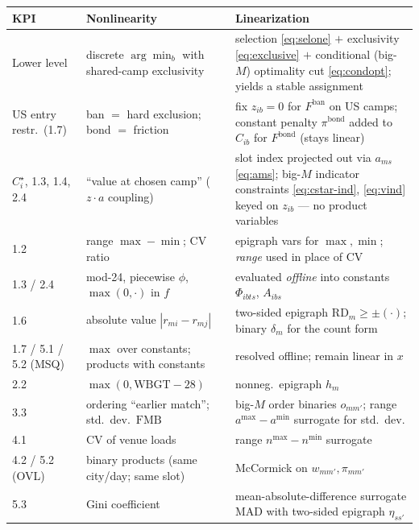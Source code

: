 \documentclass[12pt, letterpaper]{article}
\begin{document}
\begin{center}
\renewcommand{\arraystretch}{1.25}
\begin{tabular}{@{}p{2.0cm} p{4.6cm} p{6.4cm}@{}}
\toprule
\textbf{KPI} & \textbf{Nonlinearity} & \textbf{Linearization} \\
\midrule
Lower level & discrete $\arg\min_b$ with shared-camp exclusivity &
  selection \eqref{eq:selone} $+$ exclusivity \eqref{eq:exclusive} $+$
  conditional (big-$M$) optimality cut \eqref{eq:condopt}; yields a
  stable assignment \\
US entry restr.\ (1.7) & ban $=$ hard exclusion; bond $=$ friction &
  fix $z_{ib}=0$ for $F^{\mathrm{ban}}$ on US camps; constant penalty
  $\pi^{\mathrm{bond}}$ added to $C_{ib}$ for $F^{\mathrm{bond}}$ (stays
  linear) \\
$C_i^\star$, 1.3, 1.4, 2.4 & ``value at chosen camp'' ($z\!\cdot\!a$
  coupling) &
  slot index projected out via $a_{ms}$ \eqref{eq:ams}; big-$M$ indicator
  constraints \eqref{eq:cstar-ind}, \eqref{eq:vind} keyed on $z_{ib}$ ---
  no product variables \\
1.2 & range $\max-\min$; CV ratio &
  epigraph vars for $\max,\min$; \emph{range} used in place of CV \\
1.3 / 2.4 & mod-24, piecewise $\phi$, $\max(0,\cdot)$ in $f$ &
  evaluated \emph{offline} into constants $\Phi_{ibts}$, $A_{ibs}$ \\
1.6 & absolute value $|r_{mi}-r_{mj}|$ &
  two-sided epigraph $\mathrm{RD}_m\ge\pm(\cdot)$; binary $\delta_m$ for
  the count form \\
1.7 / 5.1 / 5.2 (MSQ) & $\max$ over constants; products with constants &
  resolved offline; remain linear in $x$ \\
2.2 & $\max(0,\mathrm{WBGT}-28)$ & nonneg.\ epigraph $h_m$ \\
3.3 & ordering ``earlier match''; std.\ dev.\ $\mathrm{FMB}$ &
  big-$M$ order binaries $o_{mm'}$; range $a^{\max}-a^{\min}$ surrogate
  for std.\ dev. \\
4.1 & CV of venue loads & range $n^{\max}-n^{\min}$ surrogate \\
4.2 / 5.2 (OVL) & binary products (same city/day; same slot) &
  McCormick on $w_{mm'},\pi_{mm'}$ \\
5.3 & Gini coefficient &
  mean-absolute-difference surrogate $\mathrm{MAD}$ with two-sided
  epigraph $\eta_{ss'}$ \\
\bottomrule
\end{tabular}
\end{center}
\end{document}
